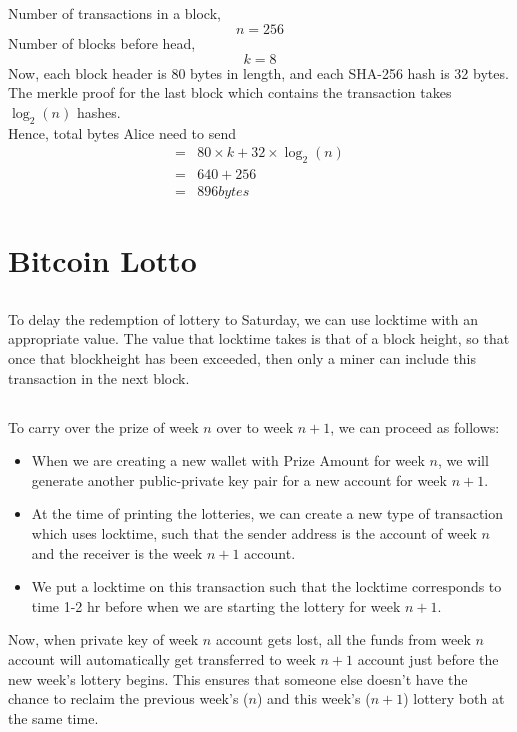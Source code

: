 \documentclass[12pt, a4paper]{article}
\begin{document}
\subsection{}

 Number of transactions in a block,
  $$ n = 256$$
 Number of blocks before head,
  $$k  = 8$$
	Now, each block header is 80 bytes in length, and each SHA-256 hash is 32 bytes. The merkle proof for the last block which contains the transaction takes $\log_2{(n)}$ hashes.
	\\
	Hence, total bytes Alice need to send
	\begin{align*}
		=& 80 \times k + 32 \times \log_2{(n)}  \\
		=& 640 + 256 \\
		=& 896 bytes
	\end{align*}
\subsection{}


\section{Bitcoin Lotto}
\subsection{}
To delay the redemption of lottery to Saturday, we can use locktime with an appropriate value. The value that locktime takes is that of a block height, so that once that blockheight has been exceeded, then only a miner can include this transaction in the next block. 
\subsection{}
To carry over the prize of week $n$ over to week $n+1$, we can proceed as follows:
\begin{itemize}
		\item When we are creating a new wallet with Prize Amount for week $n$, we will generate another public-private key pair for a new account for week $n+1$.
		\item At the time of printing the lotteries, we can create a new type of transaction which uses locktime, such that the sender address is the account of week $n$ and the receiver is the week $n+1$ account.
		\item We put a locktime on this transaction such that the locktime corresponds to time 1-2 hr before when we are starting the lottery for week $n+1$.
\end{itemize}
Now, when private key of week $n$ account gets lost, all the funds from week $n$ account will automatically get transferred to week $n+1$ account just before the new week's lottery begins. This ensures that someone else doesn't have the chance to reclaim the previous week's ($n$) and this week's ($n+1$) lottery both at the same time.
\end{document}
